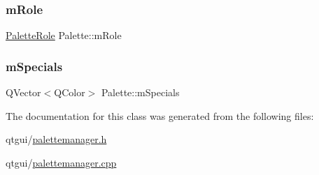\mbox{\label{class_palette_a2d05e56292f9d2ea5b05ed51e0f0fc33}} 
\subsubsection{\texorpdfstring{mRole}{mRole}}
{\footnotesize\ttfamily \mbox{\hyperlink{palettemanager_8h_adf4610684920d9165d0d74c1ea45b269}{Palette\+Role}} Palette\+::m\+Role\hspace{0.3cm}{\ttfamily [protected]}}

\mbox{\label{class_palette_ac1b0d344288bd4d35e5bea2a24f8e237}} 
\subsubsection{\texorpdfstring{mSpecials}{mSpecials}}
{\footnotesize\ttfamily Q\+Vector$<$Q\+Color$>$ Palette\+::m\+Specials\hspace{0.3cm}{\ttfamily [protected]}}



The documentation for this class was generated from the following files\+:\begin{DoxyCompactItemize}
\item 
qtgui/\mbox{\hyperlink{palettemanager_8h}{palettemanager.\+h}}\item 
qtgui/\mbox{\hyperlink{palettemanager_8cpp}{palettemanager.\+cpp}}\end{DoxyCompactItemize}
